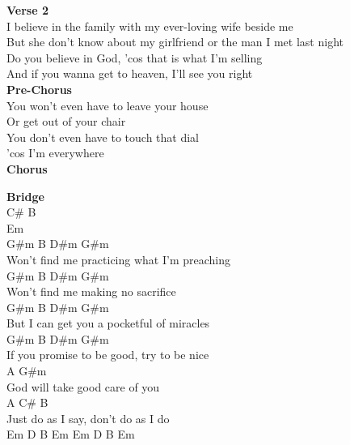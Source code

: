 \documentclass[a4paper]{article}
\begin{document}
{{        }
        \textbf{Verse 2}
        ~\\
        {
            \cutive
            \obeyspaces
I believe in the family with my ever-loving wife beside me
\\
But she don't know about my girlfriend or the man I met last night
\\
   Do you believe in God, 'cos that is what I'm selling
\\
And if you wanna get to heaven, I'll see you right
\\

        }
        \textbf{Pre-Chorus}
        ~\\
        {
            \cutive
            \obeyspaces
You won't even have to leave your house
\\
Or get out of your chair
\\
You don't even have to touch that dial
\\
'cos I'm everywhere
\\

        }
        \textbf{Chorus}
        ~\\
        {
            \cutive
            \obeyspaces

        }
        \textbf{Bridge}
        ~\\
        {
            \cutive
            \obeyspaces
C\# B
\\
Em 
\\
G\#m           B          D\#m      G\#m
\\
Won't find me practicing what I'm preaching
\\
G\#m           B         D\#m  G\#m
\\
Won't find me making no sacrifice
\\
G\#m       B         D\#m          G\#m
\\
But I can get you a pocketful of miracles
\\
G\#m               B        D\#m       G\#m
\\
If you promise to be good, try to be nice
\\
A                          G\#m
\\
God will take good care of you
\\
     A                          C\# B
\\
Just do as I say, don't do as I do
\\
Em  D  B  Em  Em  D  B  Em 
\\

}}
\end{document}
